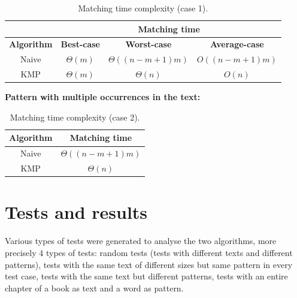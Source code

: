 \documentclass[11pt]{article}
\begin{document}
            \begin{table}[H]
                \centering
                    \begin{tabular}{|c|c|c|c|}
                        \hhline{~|---|}
                        \multicolumn{1}{c|}{}& \multicolumn{3}{c|}{\textbf{Matching time}} \\
                        \hline
                        \textbf{Algorithm} & \textbf{Best-case} & \textbf{Worst-case} & \textbf{Average-case} \\
                        \hline
                        Naive & $\Theta(m)$ & $\Theta((n-m+1)m)$ & $O((n-m+1)m)$ \\
                        \hline
                        KMP & $\Theta(m)$ & $\Theta(n)$ & $O(n)$ \\ %
                        \hline
                    \end{tabular}
                \caption{Matching time complexity (case 1).}
                \label{tab:matching_time_complexity_1}
            \end{table}


            \noindent \quad \textbf{Pattern with multiple occurrences in the text:}

            \begin{table}[H]
                \centering
                \begin{tabular}{|c|c|}
                    \hline
                    \textbf{Algorithm} & \textbf{Matching time} \\
                    \hline
                    Naive & $\Theta((n-m+1)m)$ \\
                    \hline
                    KMP & $\Theta(n)$ \\
                    \hline
                \end{tabular}
                \caption{Matching time complexity (case 2).}
                \label{tab:matching_time_complexity_2}
            \end{table}

    \section{Tests and results} \label{sec:tests_and_results}

        Various types of tests were generated to analyse the two algorithms, more precisely 4 types of tests:
        random tests (tests with different texts and different patterns),
        tests with the same text of different sizes but same pattern in every test case,
        tests with the same text but different patterns,
        tests with an entire chapter of a book as text and a word as pattern.
\end{document}
